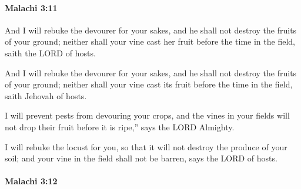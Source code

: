 		\paragraph{Malachi 3:11} %
			\label{MALACHI-3-11}

			And I will rebuke the devourer for your sakes, and he shall not destroy the fruits of your ground; neither shall your vine cast her fruit before the time in the field, saith the LORD of hosts.

			\begin{versebox}
					\item[BHS] 
					\item[LXX] 
					\item[ASV] And I will rebuke the devourer for your sakes, and he shall not destroy the fruits of your ground; neither shall your vine cast its fruit before the time in the field, saith Jehovah of hosts.
					\item[NIV] I will prevent pests from devouring your crops, and the vines in your fields will not drop their fruit before it is ripe,” says the LORD Almighty.
					\item[NRSV] I will rebuke the locust for you, so that it will not destroy the produce of your soil; and your vine in the field shall not be barren, says the LORD of hosts.
			\end{versebox}

		\paragraph{Malachi 3:12} %
			\label{MALACHI-3-12}

